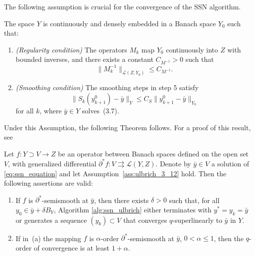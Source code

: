 The following assumption is crucial for the convergence of the SSN algorithm.
\begin{assumption}\label{ass:ulbrich_3_12}
The space $Y$ is continuously and densely embedded in a Banach space $Y_0$ such that:
\begin{enumerate}
\item[(a)] \emph{(Regularity condition)}  
The operators $M_k$ map $Y_0$ continuously into $Z$ with bounded inverses, and there exists a constant
$C_{M^{-1}} > 0$ such that
\[
\|M_k^{-1}\|_{\mathcal{L}(Z,Y_0)} \le C_{M^{-1}}.
\]

\item[(b)] \emph{(Smoothing condition)}  
The smoothing steps in step 5 satisfy
\[
\|S_k(y_{k+1}^0) - \bar y\|_Y \le C_S \|y_{k+1}^0 - \bar y\|_{Y_0}
\]
for all $k$, where $\bar y \in Y$ solves~(3.7).
\end{enumerate}
\end{assumption}

Under this Assumption, the following Theorem follows. For a proof 
of this result, see \cite[Theorem 3.13]{ulbrich}

\begin{theorem}\label{thm:ssn_convergence}
Let $f : Y \supset V \to Z$ be an operator between Banach spaces defined on the open set $V$,
with generalized differential $\partial^* f : V \rightrightarrows \mathcal{L}(Y,Z)$.
Denote by $\bar y \in V$ a solution of \eqref{eq:ssn_equation} and let Assumption~\ref{ass:ulbrich_3_12} hold.
Then the following assertions are valid:
\begin{enumerate}
\item[(a)]
If $f$ is $\partial^*$-semismooth at $\bar y$, then there exists $\delta > 0$ such that,
for all $y_0 \in \bar y + \delta B_Y$,
Algorithm \ref{alg:ssn_ulbrich} either terminates with $y^* = y_k = \bar y$ or generates a sequence
$(y_k) \subset V$ that converges $q$-superlinearly to $\bar y$ in $Y$.

\item[(b)]
If in~(a) the mapping $f$ is $\alpha$-order $\partial^*$-semismooth at $\bar y$,
$0 < \alpha \le 1$, then the $q$-order of convergence is at least $1+\alpha$.
\end{enumerate}
\end{theorem}
